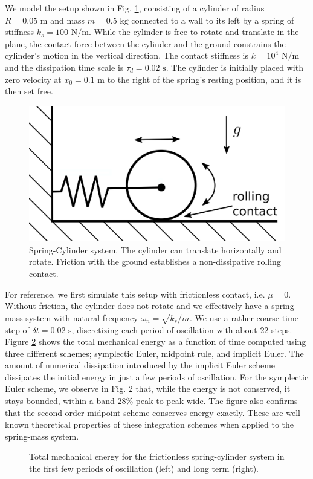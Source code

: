 We model the setup shown in Fig. \ref{fig:spring_cylinder}, consisting
of a cylinder of radius $R=0.05\text{ m}$ and mass $m=0.5\text{ kg}$ connected
to a wall to its left by a spring of stiffness $k_s=100\text{ N}/\text{m}$.
While the cylinder is free to rotate and translate in the plane, the contact
force between the cylinder and the ground constrains the cylinder's motion in
the vertical direction. The contact stiffness is $k=10^{4}\text{ N}/\text{m}$
and the dissipation time scale is $\tau_d=0.02\text{ s}$. The cylinder is
initially placed with zero velocity at $x_0=0.1\text{ m}$ to the right of the
spring's resting position, and it is then set free.
\begin{figure}[!h]
	\centering
	\includegraphics[width=0.6\columnwidth]{figures/schematics/spring_cylinder.png}
	\caption{\label{fig:spring_cylinder} 
	Spring-Cylinder system. The cylinder can translate horizontally and rotate.
	Friction with the ground establishes a non-dissipative rolling contact.}
\end{figure}

For reference, we first simulate this setup with frictionless contact, i.e.
$\mu=0$. Without friction, the cylinder does not rotate and we effectively have a
spring-mass system with natural frequency $\omega_n=\sqrt{k_s/m}$. We use a
rather coarse time step of $\delta t=0.02\text{ s}$, discretizing each period of
oscillation with about $22$ steps. Figure
\ref{fig:frictionless_spring_cylinder_energy} shows the total mechanical energy
as a function of time computed using three different schemes; symplectic Euler,
midpoint rule, and implicit Euler. The amount of numerical dissipation
introduced by the implicit Euler scheme dissipates the initial energy in just a
few periods of oscillation. For the symplectic Euler scheme, we observe in Fig.
\ref{fig:frictionless_spring_cylinder_energy} that, while the energy is not
conserved, it stays bounded, within a band 28\% peak-to-peak wide. The figure
also confirms that the second order midpoint scheme conserves energy exactly. These are well known theoretical properties of these
integration schemes when applied to the spring-mass system.
\begin{figure}[!h]
    \centering
    \caption{\label{fig:frictionless_spring_cylinder_energy} 
    Total mechanical energy for the frictionless spring-cylinder system in the
    first few periods of oscillation (left) and long term (right).}
\end{figure}

